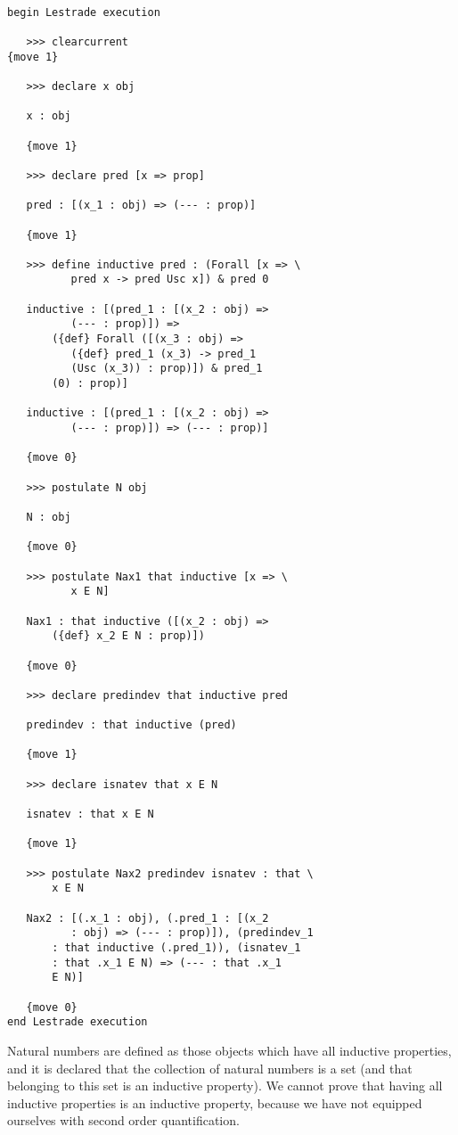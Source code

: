 \documentclass[12pt]{article}
\begin{document}
\begin{verbatim}

begin Lestrade execution

   >>> clearcurrent
{move 1}

   >>> declare x obj

   x : obj

   {move 1}

   >>> declare pred [x => prop]

   pred : [(x_1 : obj) => (--- : prop)]

   {move 1}

   >>> define inductive pred : (Forall [x => \
          pred x -> pred Usc x]) & pred 0

   inductive : [(pred_1 : [(x_2 : obj) => 
          (--- : prop)]) => 
       ({def} Forall ([(x_3 : obj) => 
          ({def} pred_1 (x_3) -> pred_1 
          (Usc (x_3)) : prop)]) & pred_1 
       (0) : prop)]

   inductive : [(pred_1 : [(x_2 : obj) => 
          (--- : prop)]) => (--- : prop)]

   {move 0}

   >>> postulate N obj

   N : obj

   {move 0}

   >>> postulate Nax1 that inductive [x => \
          x E N]

   Nax1 : that inductive ([(x_2 : obj) => 
       ({def} x_2 E N : prop)])

   {move 0}

   >>> declare predindev that inductive pred

   predindev : that inductive (pred)

   {move 1}

   >>> declare isnatev that x E N

   isnatev : that x E N

   {move 1}

   >>> postulate Nax2 predindev isnatev : that \
       x E N

   Nax2 : [(.x_1 : obj), (.pred_1 : [(x_2 
          : obj) => (--- : prop)]), (predindev_1 
       : that inductive (.pred_1)), (isnatev_1 
       : that .x_1 E N) => (--- : that .x_1 
       E N)]

   {move 0}
end Lestrade execution
\end{verbatim}

Natural numbers are defined as those objects which have all inductive properties, and it is declared that the collection of natural numbers is a set (and that belonging to this set
is an inductive property).  We cannot prove that having all inductive properties is an inductive property, because we have not equipped ourselves with second order quantification.
\end{document}
